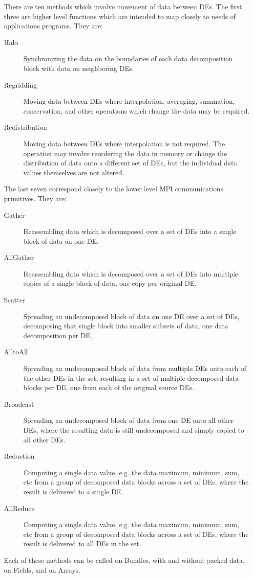 There are ten methods which involve movement of data between DEs.
The first three are higher level functions which are intended to
map closely to needs of applications programs.  They are:
\begin{description}
\item[Halo]
Synchronizing the data on the boundaries of each data decomposition 
block with data on neighboring DEs.
\item[Regridding]
Moving data between DEs where interpolation, averaging,
summation, conservation, and other operations which change the data 
may be required.
\item[Redistribution] 
Moving data between DEs where interpolation is not required.  The operation
may involve reordering the data in memory or 
change the distribution of data onto a different set of DEs, but 
the individual data values themselves are not altered. 
\end{description}
The last seven correspond closely to the lower level
MPI communications primitives.  They are:
\begin{description}
\item[Gather]
Reassembling data which is decomposed over a set of DEs into a single
block of data on one DE.
\item[AllGather]
Reassembling data which is decomposed over a set of DEs into multiple
copies of a single block of data, one copy per original DE.
\item[Scatter]
Spreading an undecomposed block of data on one DE over a set of DEs,
decomposing that single block into smaller subsets of data, one
data decomposition per DE.
\item[AlltoAll]
Spreading an undecomposed block of data from multiple DEs onto
each of the other DEs in the set, resulting in a set of multiple decomposed 
data blocks per DE, one from each of the original source DEs.
\item[Broadcast]
Spreading an undecomposed block of data from one DE onto all other
DEs, where the resulting data is still undecomposed and simply
copied to all other DEs.
\item[Reduction]
Computing a single data value, e.g. the data maximum, minimum, sum, etc
from a group of decomposed data blocks across a set of DEs, where the
result is delivered to a single DE.
\item[AllReduce]
Computing a single data value, e.g. the data maximum, minimum, sum, etc
from a group of decomposed data blocks across a set of DEs, where the
result is delivered to all DEs in the set.
\end{description}

Each of these methods can be called on Bundles, with and without packed
data, on Fields, and on Arrays.

